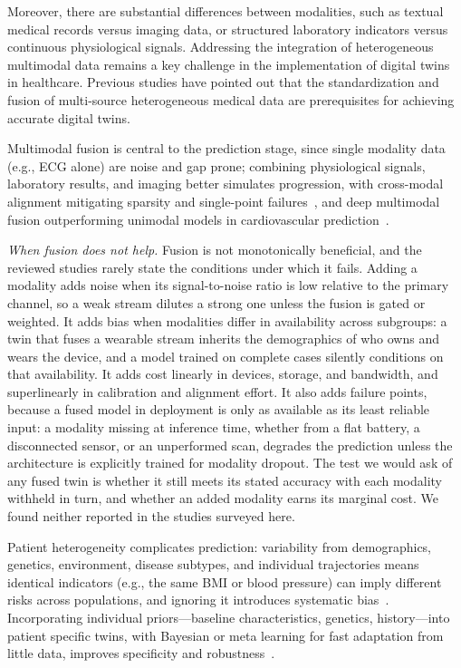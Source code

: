 \documentclass[journal]{IEEEtran}
\begin{document}
Moreover, there are substantial differences between modalities, such as textual medical records versus imaging data, or structured laboratory indicators versus continuous physiological signals. Addressing the integration of heterogeneous multimodal data remains a key challenge in the implementation of digital twins in healthcare. Previous studies have pointed out that the standardization and fusion of multi-source heterogeneous medical data are prerequisites for achieving accurate digital twins\cite{tao2019digital,reddy2015healthcare}.

Multimodal fusion is central to the prediction stage, since single modality data (e.g., ECG alone) are noise and gap prone; combining physiological signals, laboratory results, and imaging better simulates progression, with cross-modal alignment mitigating sparsity and single-point failures~\cite{baltrusaitis2019multimodal}, and deep multimodal fusion outperforming unimodal models in cardiovascular prediction~\cite{huang2020fusion}.



\emph{When fusion does not help.} Fusion is not monotonically beneficial, and the reviewed studies rarely state the conditions under which it fails. Adding a modality adds noise when its signal-to-noise ratio is low relative to the primary channel, so a weak stream dilutes a strong one unless the fusion is gated or weighted. It adds bias when modalities differ in availability across subgroups: a twin that fuses a wearable stream inherits the demographics of who owns and wears the device, and a model trained on complete cases silently conditions on that availability. It adds cost linearly in devices, storage, and bandwidth, and superlinearly in calibration and alignment effort. It also adds failure points, because a fused model in deployment is only as available as its least reliable input: a modality missing at inference time, whether from a flat battery, a disconnected sensor, or an unperformed scan, degrades the prediction unless the architecture is explicitly trained for modality dropout. The test we would ask of any fused twin is whether it still meets its stated accuracy with each modality withheld in turn, and whether an added modality earns its marginal cost. We found neither reported in the studies surveyed here.

Patient heterogeneity complicates prediction: variability from demographics, genetics, environment, disease subtypes, and individual trajectories means identical indicators (e.g., the same BMI or blood pressure) can imply different risks across populations, and ignoring it introduces systematic bias~\cite{obermeyer2016predicting,rajkomar2019machine,yu2018artificial}. Incorporating individual priors---baseline characteristics, genetics, history---into patient specific twins, with Bayesian or meta learning for fast adaptation from little data, improves specificity and robustness~\cite{bjornsson2020digitaltwins}.
\end{document}
